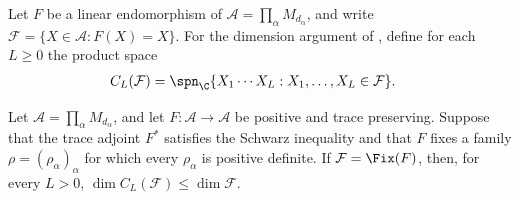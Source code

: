 \begin{definition}
    \label{def:mpdo_vertical_fixed_point_products}
    \leanok
    Let $F$ be a linear endomorphism of
    $\mathcal A=\prod_\alpha M_{d_\alpha}$, and write
    $\mathcal F=\{X\in\mathcal A:F(X)=X\}$. For the dimension argument of
    \cite[Appendix~C.4, lines~1980--1993]{Cirac2016MPDO_arXiv}, define for
    each $L\geq0$ the product space
    \begin{align}
        C_L(\mathcal F)
         & =\spn_{\C}\{X_1\cdots X_L:X_1,\ldots,X_L\in\mathcal F\}.
        \notag
    \end{align}
\end{definition}

\begin{lemma}
    \label{thm:mpdo_density_blocks_fixed_point_product_dimension}
    \leanok
    Let $\mathcal A=\prod_\alpha M_{d_\alpha}$, and let
    $F:\mathcal A\to\mathcal A$ be positive and trace preserving.
    Suppose that the trace adjoint $F^*$ satisfies the Schwarz inequality and
    that $F$ fixes a family $\rho=(\rho_\alpha)_\alpha$ for which every
    $\rho_\alpha$ is positive definite. If $\mathcal F=\Fix(F)$, then, for
    every $L>0$, $\dim C_L(\mathcal F)\leq\dim\mathcal F$.
\end{lemma}

